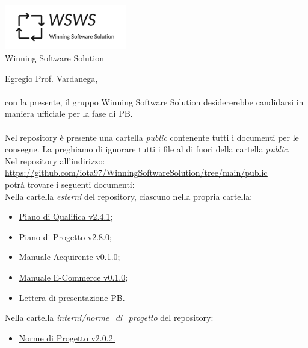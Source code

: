 \documentclass[a4paper, 12pt]{letter}
\begin{document}
\begin{center}
\includegraphics[width=0.4\textwidth]{WSWS-logos_transparent_crop}\\
{\Large Winning Software Solution}\\[24pt]
\end{center}
Egregio Prof. Vardanega,\\\\
con la presente, il gruppo Winning Software Solution desidererebbe candidarsi in maniera ufficiale
per la fase di PB.\\\\
Nel repository è presente una cartella \textit{public} contenente tutti i documenti per le consegne. La preghiamo di ignorare tutti i file
al di fuori della cartella \textit{public}.\\
Nel repository all'indirizzo: \\
\href{https://github.com/iota97/WinningSoftwareSolution/tree/main/public}{\underline{https://github.com/iota97/WinningSoftwareSolution/tree/main/public}}\\ 
potrà trovare i seguenti documenti:\\

Nella cartella \textit{esterni} del repository, ciascuno nella propria cartella:
\begin{itemize}
\item \href{https://github.com/iota97/WinningSoftwareSolution/tree/main/public/esterni/piano_di_qualifica/piano_di_qualifica_v2.4.1.pdf}{Piano di Qualifica v2.4.1};
\item \href{https://github.com/iota97/WinningSoftwareSolution/tree/main/public/esterni/piano_di_progetto/piano_di_progetto_v2.8.0.pdf}{Piano di Progetto v2.8.0};
\item \href{https://github.com/iota97/WinningSoftwareSolution/tree/main/public/esterni/manuale_acquirente/manuale_acquirente_v0.1.0.pdf}{Manuale Acquirente v0.1.0};
\item \href{https://github.com/iota97/WinningSoftwareSolution/tree/main/public/esterni/manuale_e-commerce/manuale_e-commerce_v0.1.0.pdf}{Manuale E-Commerce v0.1.0};
\item \href{https://github.com/iota97/WinningSoftwareSolution/tree/main/public/esterni/lettera_pb/lettera_di_presentazione.pdf}{Lettera di presentazione PB}.
\end{itemize}
Nella cartella \textit{interni/norme\_di\_progetto} del repository:
\begin{itemize}
    \item \href{https://github.com/iota97/WinningSoftwareSolution/tree/main/public/interni/norme_di_progetto/norme_di_progetto_v2.0.2.pdf}{Norme di Progetto v2.0.2.}
\end{itemize}
\end{document}

